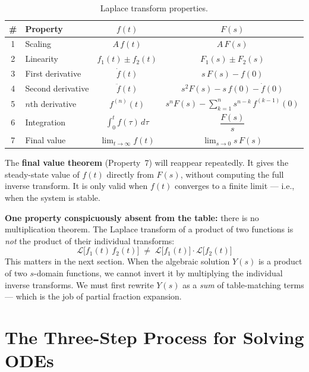 \documentclass[../../book.tex]{subfiles}
\begin{document}
\begin{table}[htbp]
\centering
\caption{Laplace transform properties.}
\label{tab:theorems}
\begin{tabular}{clcc}
\toprule
\# & Property & $f(t)$ & $F(s)$ \\
\midrule
1 & Scaling      & $A\,f(t)$            & $A\,F(s)$ \\[4pt]
2 & Linearity    & $f_1(t) \pm f_2(t)$  & $F_1(s) \pm F_2(s)$ \\[4pt]
3 & First derivative  & $\dot{f}(t)$   & $s\,F(s) - f(0)$ \\[4pt]
4 & Second derivative & $\ddot{f}(t)$  & $s^2 F(s) - s\,f(0) - \dot{f}(0)$ \\[6pt]
5 & $n$th derivative  & $f^{(n)}(t)$   & $\displaystyle s^n F(s)
    - \sum_{k=1}^{n} s^{n-k}\, f^{(k-1)}(0)$ \\[8pt]
6 & Integration  & $\displaystyle\int_0^t f(\tau)\,d\tau$
                                        & $\dfrac{F(s)}{s}$ \\[8pt]
7 & Final value  & $\displaystyle\lim_{t\to\infty} f(t)$
                                        & $\displaystyle\lim_{s\to 0} s\,F(s)$ \\[4pt]
\bottomrule
\end{tabular}
\end{table}

The \textbf{final value theorem} (Property~7) will reappear repeatedly.  It
gives the steady-state value of $f(t)$ directly from $F(s)$, without computing
the full inverse transform.  It is only valid when $f(t)$ converges to a finite
limit --- i.e., when the system is stable.

\textbf{One property conspicuously absent from the table:} there is no
multiplication theorem.  The Laplace transform of a product of two functions is
\emph{not} the product of their individual transforms:
\begin{equation}
  \mathcal{L}\bigl[f_1(t)\,f_2(t)\bigr] \;\neq\; \mathcal{L}\bigl[f_1(t)\bigr]
  \cdot \mathcal{L}\bigl[f_2(t)\bigr]
  \label{eq:no_product}
\end{equation}
This matters in the next section.  When the algebraic solution $Y(s)$ is a
product of two $s$-domain functions, we cannot invert it by multiplying the
individual inverse transforms.  We must first rewrite $Y(s)$ as a \emph{sum}
of table-matching terms --- which is the job of partial fraction expansion.

\section{The Three-Step Process for Solving ODEs}
\label{sec:threestep}
\end{document}
